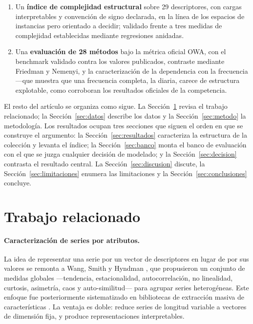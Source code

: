 \begin{enumerate}
      estorbar y el aporte de la estratificación pierde significancia. El régimen es una
      propiedad del conjunto de modelos y se determina frecuencia por frecuencia, no
      globalmente. De ahí se desprende una regla operativa ---mirar la dispersión de calidad
      del pool antes de decidir---, que este trabajo no valida fuera de M4 para el régimen,
      aunque la réplica sobre M3 la confirma del lado de la selección.
\item Un \textbf{índice de complejidad estructural} sobre 29 descriptores, con cargas
      interpretables y convención de signo declarada, en la línea de los espacios de
      instancias \cite{kang2017} pero orientado a decidir; validado frente a tres medidas
      de complejidad establecidas mediante regresiones anidadas.
\item Una \textbf{evaluación de 28 métodos} bajo la métrica oficial OWA, con el benchmark
      validado contra los valores publicados, contraste mediante Friedman y Nemenyi, y la
      caracterización de la dependencia con la frecuencia ---que muestra que una
      frecuencia completa, la diaria, carece de estructura explotable, como corroboran
      los resultados oficiales de la competencia.
\end{enumerate}

El resto del artículo se organiza como sigue. La Sección~\ref{sec:trabajo} revisa
el trabajo relacionado; la Sección~\ref{sec:datos} describe los datos y la
Sección~\ref{sec:metodo} la metodología. Los resultados ocupan tres secciones que
siguen el orden en que se construye el argumento: la
Sección~\ref{sec:resultados} caracteriza la estructura de la colección y levanta
el índice; la Sección~\ref{sec:banco} monta el banco de evaluación con el que se
juzga cualquier decisión de modelado; y la Sección~\ref{sec:decision} contrasta el
resultado central. La Sección~\ref{sec:discusion} discute, la
Sección~\ref{sec:limitaciones} enumera las limitaciones y la
Sección~\ref{sec:conclusiones} concluye.


\section{Trabajo relacionado}\label{sec:trabajo}

\paragraph{Caracterización de series por atributos.} La idea de representar una
serie por un vector de descriptores en lugar de por sus valores se remonta a
Wang, Smith y Hyndman \cite{wang2006}, que propusieron un conjunto de medidas
globales ---tendencia, estacionalidad, autocorrelación, no linealidad, curtosis,
asimetría, caos y auto-similitud--- para agrupar series heterogéneas. Este enfoque
fue posteriormente sistematizado en bibliotecas de extracción masiva de
características \cite{fulcher2017}. La ventaja es doble: reduce series de longitud
variable a vectores de dimensión fija, y produce representaciones interpretables.

